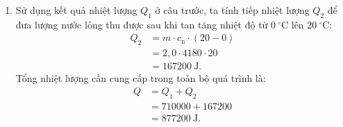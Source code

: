 \begin{vidumau}
{\begin{enumerate}
\[\begin{aligned}
			&= 3{,}34 \cdot 10^5 \cdot 2{,}0 \\
			&= 668000\ \mathrm{J}.
		\end{aligned}
		\]
		Nhiệt lượng $Q_1$ cần thiết cho giai đoạn này là:
		\[
		\begin{aligned}
			Q_1 &= Q_{\text{nâng}} + Q_{\text{nóng chảy}} \\
			&= 42000 + 668000 \\
			&= 710000\ \mathrm{J}.
		\end{aligned}
		\]
		\item Sử dụng kết quả nhiệt lượng $Q_1$ ở câu trước, ta tính tiếp nhiệt lượng $Q_2$ để đưa lượng nước lỏng thu được sau khi tan tăng nhiệt độ từ $0\ ^\circ\mathrm{C}$ lên $20\ ^\circ\mathrm{C}$:
		\[
		\begin{aligned}
			Q_2 &= m \cdot c_{\text{n}} \cdot (20 - 0) \\
			&= 2{,}0 \cdot 4180 \cdot 20 \\
			&= 167200\ \mathrm{J}.
		\end{aligned}
		\]
		Tổng nhiệt lượng cần cung cấp trong toàn bộ quá trình là:
		\[
		\begin{aligned}
			Q &= Q_1 + Q_2 \\
			&= 710000 + 167200 \\
			&= 877200\ \mathrm{J}.
		\end{aligned}
		\]
	\end{enumerate}
}
\end{vidumau}
